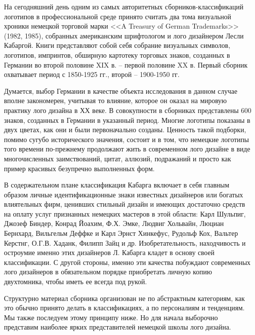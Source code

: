 На сегодняшний день одним из самых авторитетных сборников-классификаций логотипов в профессиональной
среде принято считать два тома визуальной хроники немецкой торговой марки <<A Treasury of German
Trademarks>> (1982, 1985), собранных американским шрифтологом и лого дизайнером Лесли
Кабаргой. Книги представляют собой себя собрание визуальных символов, логотипов, импринтов, обширную
картотеку торговых знаков, созданных в Германии во второй половине XIX в. -- первой половине XX
в. Первый сборник охватывает период с 1850-1925 гг., второй -- 1900-1950 гг.

Думается, выбор Германии в качестве объекта исследования в данном случае вполне закономерен,
учитывая то влияние, которое он оказал на мировую практику лого дизайна в ХХ веке. В совокупности в
сборниках представлены 600 знаков, созданных в Германии в указанный период. Многие логотипы показаны
в двух цветах, как они и были первоначально созданы. Ценность такой подборки, помимо сугубо
исторического значения, состоит и в том, что немецкие логотипы того времени по-прежнему продолжают
жить в современном лого дизайне в виде многочисленных заимствований, цитат, аллюзий, подражаний и
просто как пример красивых безупречно выполненных форм.

В содержательном плане классификация Кабарга включает в себя главным образом личные
идентификационные знаки известных дизайнеров или богатых влиятельных фирм, ценивших стильный дизайн
и имеющих достаточно средств на оплату услуг признанных немецких мастеров в этой области: Карл Шульпиг, Джозеф Биндер, Конрад Йоахим, Ф.Х. Эмке, Людвиг Хольвайн, Люциан Бернхард, Вильгельм Деффке и Карл Эрнст Хинкефус, Рудольф Кох, Вальтер Керстнг, О.Г.В. Хаданк, Филипп Зайц и др. Изобретательность, находчивость и остроумие именно этих дизайнеров Л. Кабарга кладет в
основу своей классификации. С другой стороны, именно эти качества побуждают современных лого
дизайнеров в обязательном порядке приобретать личную копию двухтомника, чтобы иметь ее всегда под
рукой.

Структурно материал сборника организован не по абстрактным категориям, как это обычно принято делать
в классификациях, а по персоналиям и тенденциям. Мы также последуем этому принципу ниже. Но для
начала выборочно представим наиболее ярких представителей немецкой школы лого дизайна.

